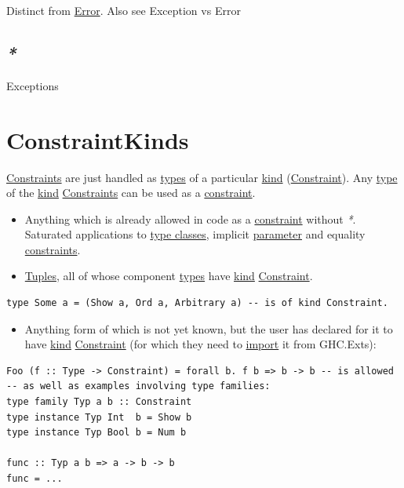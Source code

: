 \documentclass[a4paper,14pt,oneside]{book}
\begin{document}
Distinct from \hyperref[org70d92a5]{Error}. Also see \label{org0cc6328}Exception vs Error

\section{\emph{*}}
\label{sec:org65e0bf7}

\label{org1de8732}Exceptions

\chapter{\label{orgde223b2}ConstraintKinds}
\label{sec:orgf7d56c3}
\hyperref[org5960fdd]{Constraints} are just handled as \hyperref[org8e4b23c]{types} of a particular \hyperref[orgc066481]{kind} (\hyperref[org42d6266]{Constraint}).
Any \hyperref[org8fd7417]{type} of the \hyperref[orgc066481]{kind} \hyperref[org5960fdd]{Constraints} can be used as a \hyperref[org42d6266]{constraint}.
\begin{itemize}
\item Anything which is already allowed in code as a \hyperref[org42d6266]{constraint} without \emph{*}. Saturated applications to \hyperref[orgf6fcecb]{type classes}, implicit \hyperref[org3afba98]{parameter} and equality \hyperref[org5960fdd]{constraints}.
\item \hyperref[orge796dd6]{Tuples}, all of whose component \hyperref[org8e4b23c]{types} have \hyperref[orgc066481]{kind} \hyperref[org42d6266]{Constraint}.
\end{itemize}
\begin{verbatim}
type Some a = (Show a, Ord a, Arbitrary a) -- is of kind Constraint.
\end{verbatim}
\begin{itemize}
\item Anything form of which is not yet known, but the user has declared for it to have \hyperref[orgc066481]{kind} \hyperref[org42d6266]{Constraint} (for which they need to \hyperref[org8e73d91]{import} it from GHC.Exts):
\end{itemize}
\begin{verbatim}
Foo (f :: Type -> Constraint) = forall b. f b => b -> b -- is allowed
-- as well as examples involving type families:
type family Typ a b :: Constraint
type instance Typ Int  b = Show b
type instance Typ Bool b = Num b

func :: Typ a b => a -> b -> b
func = ...
\end{verbatim}
\end{document}
